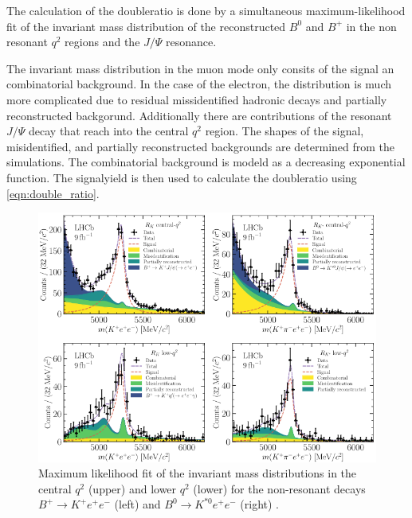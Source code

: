 The calculation of the doubleratio is done by a simultaneous maximum-likelihood fit 
of the invariant mass distribution of the reconstructed $B^0$ and $B^+$ in the non
resonant $q^2$ regions and the $J/\Psi$ resonance. 

The invariant mass distribution in the muon mode only consits of the signal an 
combinatorial background.
In the case of the electron, the distribution is much more complicated due to 
residual missidentified hadronic decays and partially reconstructed backgorund. 
Additionally there are contributions of the resonant $J/\Psi$ decay that reach 
into the central $q^2$ region.
The shapes of the signal, misidentified, and partially reconstructed backgrounds 
are determined from the simulations. The combinatorial background is modeld as a 
decreasing exponential function. 
The signalyield is then used to calculate the doubleratio using \eqref{eqn:double_ratio}.
\begin{figure}
    \centering
    \includegraphics[width=\linewidth]{figures/fits.png}
    \caption{Maximum likelihood fit of the invariant mass distributions in the central $q^2$ (upper) and lower $q^2$ (lower) for the non-resonant decays $B^+\to K^+e^+e^-$ (left) and $B^0\to K^{*0}e^+e^-$ (right) \cite{lhcbcollaboration2022test}.}
    \label{fig:fits}
\end{figure}

